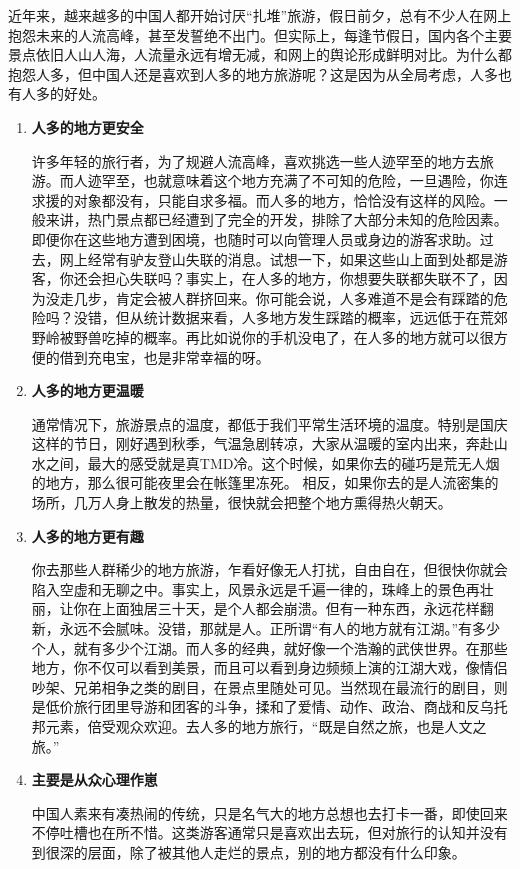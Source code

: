 近年来，越来越多的中国人都开始讨厌“扎堆”旅游，假日前夕，总有不少人在网上抱怨未来的人流高峰，甚至发誓绝不出门。但实际上，每逢节假日，国内各个主要景点依旧人山人海，人流量永远有增无减，和网上的舆论形成鲜明对比。为什么都抱怨人多，但中国人还是喜欢到人多的地方旅游呢？这是因为从全局考虑，人多也有人多的好处。
\begin{enumerate}
    
\item \textbf{人多的地方更安全}

许多年轻的旅行者，为了规避人流高峰，喜欢挑选一些人迹罕至的地方去旅游。而人迹罕至，也就意味着这个地方充满了不可知的危险，一旦遇险，你连求援的对象都没有，只能自求多福。而人多的地方，恰恰没有这样的风险。一般来讲，热门景点都已经遭到了完全的开发，排除了大部分未知的危险因素。即便你在这些地方遭到困境，也随时可以向管理人员或身边的游客求助。过去，网上经常有驴友登山失联的消息。试想一下，如果这些山上面到处都是游客，你还会担心失联吗？事实上，在人多的地方，你想要失联都失联不了，因为没走几步，肯定会被人群挤回来。你可能会说，人多难道不是会有踩踏的危险吗？没错，但从统计数据来看，人多地方发生踩踏的概率，远远低于在荒郊野岭被野兽吃掉的概率。再比如说你的手机没电了，在人多的地方就可以很方便的借到充电宝，也是非常幸福的呀。

\item \textbf{人多的地方更温暖}

通常情况下，旅游景点的温度，都低于我们平常生活环境的温度。特别是国庆这样的节日，刚好遇到秋季，气温急剧转凉，大家从温暖的室内出来，奔赴山水之间，最大的感受就是真TMD冷。这个时候，如果你去的碰巧是荒无人烟的地方，那么很可能夜里会在帐篷里冻死。 相反，如果你去的是人流密集的场所，几万人身上散发的热量，很快就会把整个地方熏得热火朝天。

\item \textbf{人多的地方更有趣}

你去那些人群稀少的地方旅游，乍看好像无人打扰，自由自在，但很快你就会陷入空虚和无聊之中。事实上，风景永远是千遍一律的，珠峰上的景色再壮丽，让你在上面独居三十天，是个人都会崩溃。但有一种东西，永远花样翻新，永远不会腻味。没错，那就是人。正所谓“有人的地方就有江湖。”有多少个人，就有多少个江湖。而人多的经典，就好像一个浩瀚的武侠世界。在那些地方，你不仅可以看到美景，而且可以看到身边频频上演的江湖大戏，像情侣吵架、兄弟相争之类的剧目，在景点里随处可见。当然现在最流行的剧目，则是低价旅行团里导游和团客的斗争，揉和了爱情、动作、政治、商战和反乌托邦元素，倍受观众欢迎。去人多的地方旅行，“既是自然之旅，也是人文之旅。”
\item \textbf{主要是从众心理作崽}

中国人素来有凑热闹的传统，只是名气大的地方总想也去打卡一番，即使回来不停吐槽也在所不惜。这类游客通常只是喜欢出去玩，但对旅行的认知并没有到很深的层面，除了被其他人走烂的景点，别的地方都没有什么印象。
\end{enumerate}

